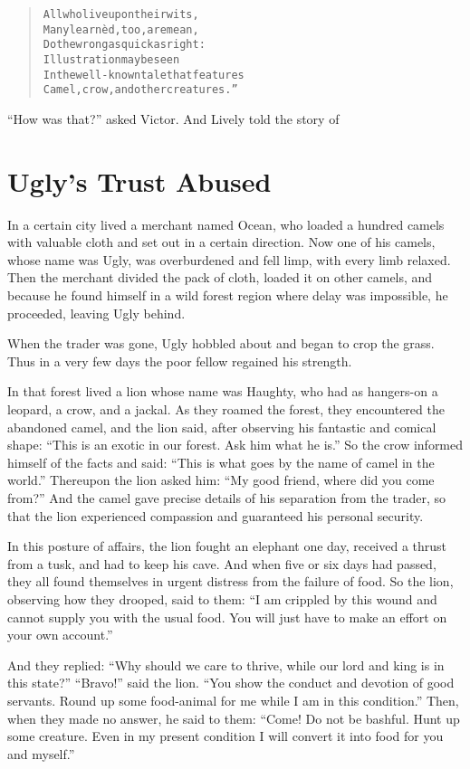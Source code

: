 \documentclass[article, twoside, 14pt]{memoir}
\renewenvironment{verbatim}{%
\begin{quote}%
\vskip -10pt%
\begin{alltt}\normalfont\large}{\end{alltt}%
\end{quote}%
\vskip -10pt
} %
\begin{document}
\begin{verbatim}
All who live upon their wits,
    Many learnèd, too, are mean,
Do the wrong as quick as right:
    Illustration may be seen
In the well-known tale that features
Camel, crow, and other creatures.”
\end{verbatim}
``How was that?'' asked Victor. And Lively told the story of

\chapter{Ugly's Trust Abused}

\label{s16}

In a certain city lived a merchant named Ocean, who loaded a
hundred camels with valuable cloth and set out in a certain
direction. Now one of his camels, whose name was Ugly, was
overburdened and fell limp, with every limb relaxed. Then the
merchant divided the pack of cloth, loaded it on other camels, and
because he found himself in a wild forest region where delay was
impossible, he proceeded, leaving Ugly behind.

When the trader was gone, Ugly hobbled about and began to crop the
grass. Thus in a very few days the poor fellow regained his
strength.

In that forest lived a lion whose name was Haughty, who had as
hangers-on a leopard, a crow, and a jackal. As they roamed the
forest, they encountered the abandoned camel, and the lion said,
after observing his fantastic and comical shape:
``This is an exotic in our forest. Ask him what he is.'' So the
crow informed himself of the facts and said:
``This is what goes by the name of camel in the world.'' Thereupon
the lion asked him: ``My good friend, where did you come from?''
And the camel gave precise details of his separation from the
trader, so that the lion experienced compassion and guaranteed his
personal security.

In this posture of affairs, the lion fought an elephant one day,
received a thrust from a tusk, and had to keep his cave. And when
five or six days had passed, they all found themselves in urgent
distress from the failure of food. So the lion, observing how they
drooped, said to them:
``I am crippled by this wound and cannot supply you with the usual food. You will just have to make an effort on your own account.''

And they replied:
``Why should we care to thrive, while our lord and king is in this state?''
``Bravo!'' said the lion.
``You show the conduct and devotion of good servants. Round up some food-animal for me while I am in this condition.''
Then, when they made no answer, he said to them:
``Come! Do not be bashful. Hunt up some creature. Even in my present condition I will convert it into food for you and myself.''
\end{document}
